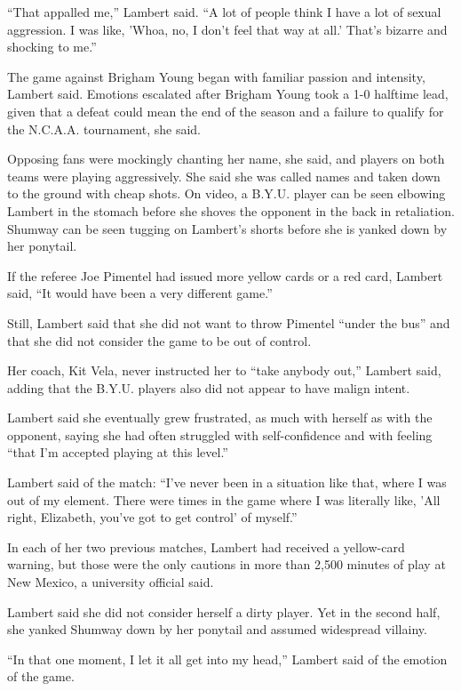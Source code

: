 ﻿\documentclass[12pt]{article}
\begin{document}
``That appalled me,'' Lambert said. ``A lot of people think I have a lot of sexual aggression. I was
like, 'Whoa, no, I don't feel that way at all.' That's bizarre and shocking to me.''

The game against Brigham Young began with familiar passion and intensity, Lambert said. Emotions
escalated after Brigham Young took a 1-0 halftime lead, given that a defeat could mean the end of
the season and a failure to qualify for the N.C.A.A. tournament, she said.

Opposing fans were mockingly chanting her name, she said, and players on both teams were playing
aggressively. She said she was called names and taken down to the ground with cheap shots. On video,
a B.Y.U. player can be seen elbowing Lambert in the stomach before she shoves the opponent in the
back in retaliation. Shumway can be seen tugging on Lambert's shorts before she is yanked down by
her ponytail.

If the referee Joe Pimentel had issued more yellow cards or a red card, Lambert said, ``It would
have been a very different game.''

Still, Lambert said that she did not want to throw Pimentel ``under the bus'' and that she did not
consider the game to be out of control.

Her coach, Kit Vela, never instructed her to ``take anybody out,'' Lambert said, adding that the
B.Y.U. players also did not appear to have malign intent.

Lambert said she eventually grew frustrated, as much with herself as with the opponent, saying she
had often struggled with self-confidence and with feeling ``that I'm accepted playing at this
level.''

Lambert said of the match: ``I've never been in a situation like that, where I was out of my
element. There were times in the game where I was literally like, 'All right, Elizabeth, you've got
to get control' of myself.''

In each of her two previous matches, Lambert had received a yellow-card warning, but those were the
only cautions in more than 2,500 minutes of play at New Mexico, a university official said.

Lambert said she did not consider herself a dirty player. Yet in the second half, she yanked Shumway
down by her ponytail and assumed widespread villainy.

``In that one moment, I let it all get into my head,'' Lambert said of the emotion of the game.
\end{document}
